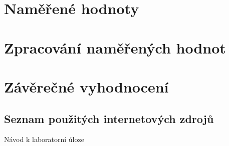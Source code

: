 \documentclass[a4paper,12pt]{article}   %
\begin{document}
\section{Naměřené hodnoty}



\section{Zpracování naměřených hodnot}


\section{Závěrečné vyhodnocení}



\clearpage
\renewcommand{\refname}{Seznam použité literatury a~zdrojů informací} 

\begin{thebibliography}{99}

\subsection*{Seznam použitých internetových zdrojů}
     Návod k laboratorní úloze
    
\end{thebibliography}
\end{document}
